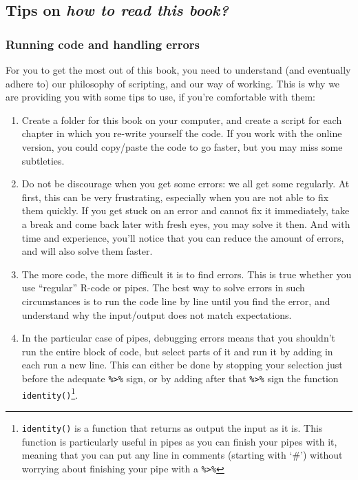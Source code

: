 \documentclass[
]{book}
\providecommand{\tightlist}{%
  \setlength{\itemsep}{0pt}\setlength{\parskip}{0pt}}
\begin{document}
\hypertarget{tips-on-how-to-read-this-book}{%
\subsection{\texorpdfstring{Tips on \emph{how to read this book?}}{Tips on how to read this book?}}\label{tips-on-how-to-read-this-book}}

\hypertarget{running-code-and-handling-errors}{%
\subsubsection{Running code and handling errors}\label{running-code-and-handling-errors}}

For you to get the most out of this book, you need to understand (and eventually adhere to) our philosophy of scripting, and our way of working. This is why we are providing you with some tips to use, if you're comfortable with them:

\begin{enumerate}
\def\labelenumi{\arabic{enumi}.}
\tightlist
\item
  Create a folder for this book on your computer, and create a script for each chapter in which you re-write yourself the code. If you work with the online version, you could copy/paste the code to go faster, but you may miss some subtleties.
\item
  Do not be discourage when you get some errors: we all get some regularly. At first, this can be very frustrating, especially when you are not able to fix them quickly. If you get stuck on an error and cannot fix it immediately, take a break and come back later with fresh eyes, you may solve it then. And with time and experience, you'll notice that you can reduce the amount of errors, and will also solve them faster.
\item
  The more code, the more difficult it is to find errors. This is true whether you use ``regular'' R-code or pipes. The best way to solve errors in such circumstances is to run the code line by line until you find the error, and understand why the input/output does not match expectations.
\item
  In the particular case of pipes, debugging errors means that you shouldn't run the entire block of code, but select parts of it and run it by adding in each run a new line. This can either be done by stopping your selection just before the adequate \texttt{\%\textgreater{}\%} sign, or by adding after that \texttt{\%\textgreater{}\%} sign the function \texttt{identity()}\footnote{\texttt{identity()} is a function that returns as output the input as it is. This function is particularly useful in pipes as you can finish your pipes with it, meaning that you can put any line in comments (starting with `\#') without worrying about finishing your pipe with a \texttt{\%\textgreater{}\%}}.
\end{enumerate}
\end{document}
